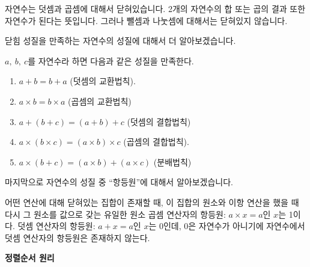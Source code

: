 \begin{flushleft}
    자연수는 덧셈과 곱셈에 대해서 닫혀있습니다. 2개의 자연수의 합 또는 곱의 결과 또한 자연수가 된다는 뜻입니다. 그러나 뺄셈과 나눗셈에 대해서는 닫혀있지 않습니다. 

    \bigskip
    닫힘 성질을 만족하는 자연수의 성질에 대해서 더 알아보겠습니다.
\end{flushleft}

\begin{tcolorbox}[colback = white, colframe = Theorem, title = \textmd{정리: 자연수에 대한 성질}]
    $a, \ b, \ c$를 자연수라 하면 다음과 같은 성질을 만족한다.
    \begin{enumerate}
        \item $a + b= b + a$    (덧셈의 교환법칙).
        \item $a \times b = b \times a$    (곱셈의 교환법칙)
        \item $a + (b + c) = (a + b) +c$    (덧셈의 결합법칙)
        \item $a \times (b \times c) = (a \times b) \times c$    (곱셈의 결합법칙).
        \item $a \times (b + c) = (a \times b) + (a \times c)$    (분배법칙)
    \end{enumerate}
\end{tcolorbox}

\newpage

\begin{flushleft}
    마지막으로 자연수의 성질 중 “항등원”에 대해서 알아보겠습니다.
\end{flushleft}

\begin{tcolorbox}[colback = white, colframe = Definition, title = \textmd{정의: 항등원}]
    어떤 연산에 대해 닫혀있는 집합이 존재할 때, 이 집합의 원소와 이항 연산을 했을 때 다시 그 원소를 값으로 갖는 유일한 원소 
    \bigskip
    곱셈 연산자의 항등원: $a \times x = a$인 $x$는 1이다.
    덧셈 연산자의 항등원: $a + x = a$인 $x$는 0인데, 0은 자연수가 아니기에 자연수에서 덧셈 연산자의 항등원은 존재하지 않는다.
\end{tcolorbox}

\bigskip
\begin{flushleft}
    {\textcolor{subheader}{{\LARGE\textbf{정렬순서 원리}}}}
\end{flushleft}

